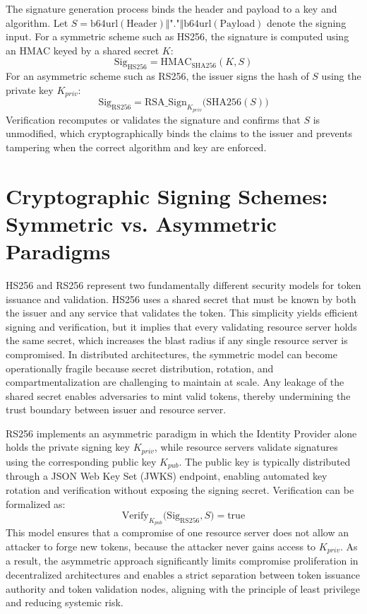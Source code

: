 \documentclass[11pt,a4paper]{report}
\begin{document}
The signature generation process binds the header and payload to a key and algorithm. Let $S = \mathrm{b64url}(\mathrm{Header}) \Vert \texttt{"."} \Vert \mathrm{b64url}(\mathrm{Payload})$ denote the signing input. For a symmetric scheme such as HS256, the signature is computed using an HMAC keyed by a shared secret $K$:
\begin{equation}
\label{eq:jwt-hs256}
\mathrm{Sig}_{\mathrm{HS256}} = \mathrm{HMAC}_{\mathrm{SHA256}}(K, S)
\end{equation}
For an asymmetric scheme such as RS256, the issuer signs the hash of $S$ using the private key $K_{priv}$:
\begin{equation}
\label{eq:jwt-rs256}
\mathrm{Sig}_{\mathrm{RS256}} = \mathrm{RSA\_Sign}_{K_{priv}}\big(\mathrm{SHA256}(S)\big)
\end{equation}
Verification recomputes or validates the signature and confirms that $S$ is unmodified, which cryptographically binds the claims to the issuer and prevents tampering when the correct algorithm and key are enforced.

\section{Cryptographic Signing Schemes: Symmetric vs. Asymmetric Paradigms}
\label{sec:signing-schemes}
HS256 and RS256 represent two fundamentally different security models for token issuance and validation. HS256 uses a shared secret that must be known by both the issuer and any service that validates the token. This simplicity yields efficient signing and verification, but it implies that every validating resource server holds the same secret, which increases the blast radius if any single resource server is compromised. In distributed architectures, the symmetric model can become operationally fragile because secret distribution, rotation, and compartmentalization are challenging to maintain at scale. Any leakage of the shared secret enables adversaries to mint valid tokens, thereby undermining the trust boundary between issuer and resource server.

RS256 implements an asymmetric paradigm in which the Identity Provider alone holds the private signing key $K_{priv}$, while resource servers validate signatures using the corresponding public key $K_{pub}$. The public key is typically distributed through a JSON Web Key Set (JWKS) endpoint, enabling automated key rotation and verification without exposing the signing secret. Verification can be formalized as:
\begin{equation}
\label{eq:jwt-verify}
\mathrm{Verify}_{K_{pub}}\big(\mathrm{Sig}_{\mathrm{RS256}}, S\big) = \mathrm{true}
\end{equation}
This model ensures that a compromise of one resource server does not allow an attacker to forge new tokens, because the attacker never gains access to $K_{priv}$. As a result, the asymmetric approach significantly limits compromise proliferation in decentralized architectures and enables a strict separation between token issuance authority and token validation nodes, aligning with the principle of least privilege and reducing systemic risk.
\end{document}
